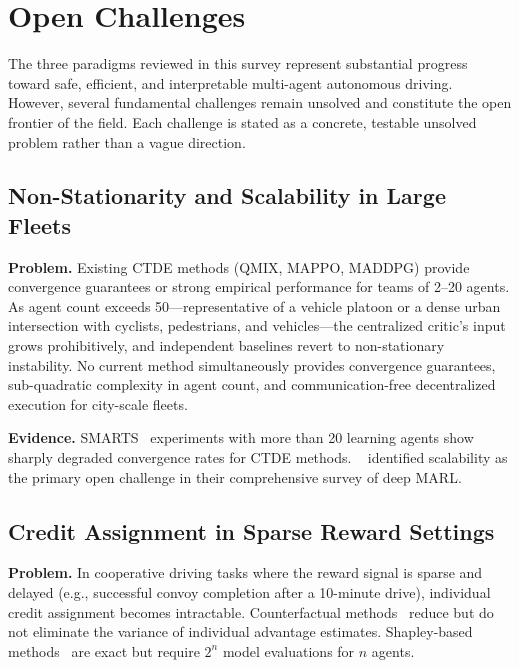 \documentclass[12pt, a4paper]{article}
\begin{document}
\section{Open Challenges}
\label{sec:challenges}

The three paradigms reviewed in this survey represent substantial progress
toward safe, efficient, and interpretable multi-agent autonomous driving.
However, several fundamental challenges remain unsolved and constitute the
open frontier of the field.  Each challenge is stated as a concrete, testable
unsolved problem rather than a vague direction.

\subsection{Non-Stationarity and Scalability in Large Fleets}
\label{sec:ch_scale}

\textbf{Problem.}  Existing CTDE methods (QMIX, MAPPO, MADDPG) provide
convergence guarantees or strong empirical performance for teams of 2--20
agents.  As agent count exceeds 50---representative of a vehicle platoon or
a dense urban intersection with cyclists, pedestrians, and vehicles---the
centralized critic's input grows prohibitively, and independent baselines
revert to non-stationary instability.  No current method simultaneously
provides convergence guarantees, sub-quadratic complexity in agent count,
and communication-free decentralized execution for city-scale fleets.

\textbf{Evidence.}  SMARTS~\cite{zhou2020smarts} experiments with more than
20 learning agents show sharply degraded convergence rates for CTDE methods.
\citeauthor{hernandez2019survey}~\cite{hernandez2019survey} identified
scalability as the primary open challenge in their comprehensive survey of
deep MARL.

\subsection{Credit Assignment in Sparse Reward Settings}
\label{sec:ch_credit}

\textbf{Problem.}  In cooperative driving tasks where the reward signal is
sparse and delayed (e.g., successful convoy completion after a 10-minute
drive), individual credit assignment becomes intractable.  Counterfactual
methods~\cite{foerster2018counterfactual} reduce but do not eliminate the
variance of individual advantage estimates.  Shapley-based methods~\cite{wang2020shapley}
are exact but require $2^n$ model evaluations for $n$ agents.
\end{document}

